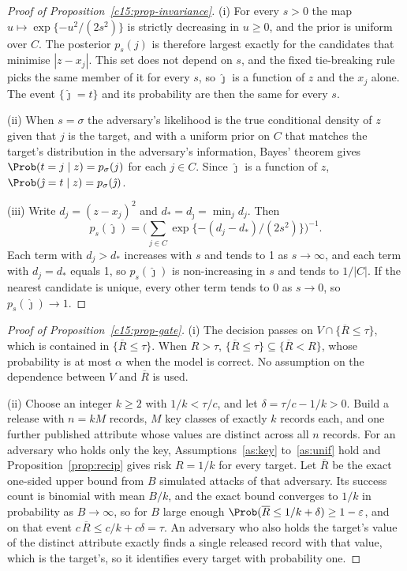 \begin{proof}[Proof of Proposition~\ref{c15:prop-invariance}]
(i) For every $s > 0$ the map $u \mapsto \exp\{-u^2/(2s^2)\}$ is strictly decreasing
in $u \ge 0$, and the prior is uniform over $C$. The posterior $p_s(j)$ is therefore
largest exactly for the candidates that minimise $|z - x_j|$. This set does not
depend on $s$, and the fixed tie-breaking rule picks the same member of it for
every $s$, so $\hat\jmath$ is a function of $z$ and the $x_j$ alone. The event
$\{\hat\jmath = t\}$ and its probability are then the same for every $s$.

(ii) When $s = \sigma$ the adversary's likelihood is the true conditional density of
$z$ given that $j$ is the target, and with a uniform prior on $C$ that matches the
target's distribution in the adversary's information, Bayes' theorem gives
$\Prob(t = j \mid z) = p_\sigma(j)$ for each $j \in C$. Since $\hat\jmath$ is a function
of $z$, $\Prob(\hat\jmath = t \mid z) = p_\sigma(\hat\jmath)$.

(iii) Write $d_j = (z - x_j)^2$ and $d_* = d_{\hat\jmath} = \min_j d_j$. Then
\[
p_s(\hat\jmath) = \Big(\sum_{j \in C} \exp\{-(d_j - d_*)/(2s^2)\}\Big)^{-1}.
\]
Each term with $d_j > d_*$ increases with $s$ and tends to 1 as $s \to \infty$, and
each term with $d_j = d_*$ equals 1, so $p_s(\hat\jmath)$ is non-increasing in $s$
and tends to $1/|C|$. If the nearest candidate is unique, every other term tends to
0 as $s \to 0$, so $p_s(\hat\jmath) \to 1$.
\end{proof}

\begin{proof}[Proof of Proposition~\ref{c15:prop-gate}]
(i) The decision passes on $V \cap \{\overline{R} \le \tau\}$, which is contained in
$\{\overline{R} \le \tau\}$. When $R > \tau$, $\{\overline{R} \le \tau\} \subseteq
\{\overline{R} < R\}$, whose probability is at most $\alpha$ when the model is
correct. No assumption on the dependence between $V$ and $\overline{R}$ is used.

(ii) Choose an integer $k \ge 2$ with $1/k < \tau/c$, and let $\delta = \tau/c - 1/k > 0$.
Build a release with $n = kM$ records, $M$ key classes of exactly $k$ records each,
and one further published attribute whose values are distinct across all $n$
records. For an adversary who holds only the key, Assumptions~\ref{as:key}
to~\ref{as:unif} hold and Proposition~\ref{prop:recip} gives risk $R = 1/k$ for every
target. Let $\overline{R}$ be the exact one-sided upper bound from $B$ simulated
attacks of that adversary. Its success count is binomial with mean $B/k$, and the
exact bound converges to $1/k$ in probability as $B \to \infty$, so for $B$ large
enough $\Prob(\overline{R} \le 1/k + \delta) \ge 1 - \varepsilon$, and on that event
$c\,\overline{R} \le c/k + c\delta = \tau$. An adversary who also holds the target's
value of the distinct attribute exactly finds a single released record with that
value, which is the target's, so it identifies every target with probability one.
\end{proof}
